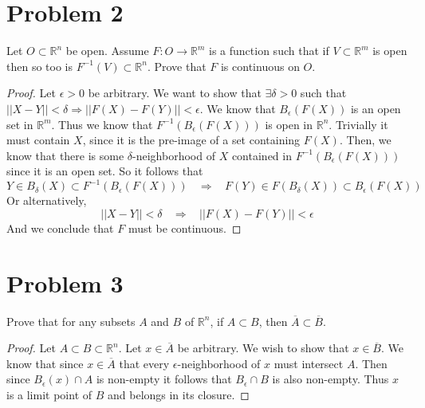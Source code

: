 \documentclass{article}
\theoremstyle{definition}
\begin{document}
\section*{Problem 2}
\begin{mdframed}
    Let $O \subset \mathbb{R}^n$ be open. Assume $F:O \rightarrow \mathbb{R}^m$ is a function such that if $V \subset \mathbb{R}^m$ is open then so too is $F^{-1}(V)\subset \mathbb{R}^n$.
    Prove that $F$ is continuous on $O$.
\end{mdframed}
\begin{proof}
    Let $\epsilon > 0$ be arbitrary. We want to show that $\exists \delta > 0$ such that $||X - Y||<\delta \Rightarrow ||F(X) - F(Y)||< \epsilon$.
    We know that $B_\epsilon(F(X))$ is an open set in $\mathbb{R}^m$. Thus we know that $F^{-1}(B_\epsilon(F(X)))$ is open in $\mathbb{R}^n$.
    Trivially it must contain $X$, since it is the pre-image of a set containing $F(X)$. Then, 
    we know that there is some $\delta$-neighborhood of $X$ contained in $F^{-1}(B_\epsilon(F(X)))$ since it is an open set.
    So it follows that
    \[
        Y \in B_\delta(X) \subset F^{-1}(B_\epsilon(F(X))) \ \ \ \ \Longrightarrow \ \ \ \ F(Y) \in F(B_\delta(X)) \subset B_\epsilon(F(X))
    \]
    Or alternatively,
    \[
        ||X - Y||< \delta \ \ \ \ \Longrightarrow \ \ \ \ ||F(X) - F(Y)|| < \epsilon
    \]
    And we conclude that $F$ must be continuous.
\end{proof}
\section*{Problem 3}
\begin{mdframed}
    Prove that for any subsets $A$ and $B$ of $\mathbb{R}^n$, if $A \subset B$, then $\overline{A} \subset \overline{B}$.
\end{mdframed}
\begin{proof}
    Let $A \subset B \subset \mathbb{R}^n$. Let $x \in \overline{A}$ be arbitrary. We wish to show that $x \in \overline{B}$.
    We know that since $x \in \overline{A}$ that every $\epsilon$-neighborhood of $x$ must intersect $A$.
    Then since $B_\epsilon(x) \cap A$ is non-empty it follows that $B_\epsilon \cap B$ is also non-empty.
    Thus $x$ is a limit point of $B$ and belongs in its closure.
\end{proof}
\end{document}
